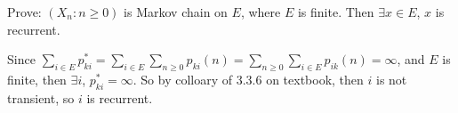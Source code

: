 \documentclass{ctexart}
\begin{document}
\begin{problem}\label{pro:3}
  Prove: \((X_n: n \geq 0)\) is Markov chain on \(E\), where \(E\) is finite. Then \(\exists x \in E\), \(x\) is recurrent.
\end{problem}
\begin{solution}
  Since \(\sum_{i \in E}p_{ki}^{*}=\sum_{i \in E}\sum_{n \geq 0}p_{ki}(n)=\sum_{n \geq 0}\sum_{i \in E}p_{ik}(n)=\infty\), and \(E\) is finite,
  then \(\exists i\), \(p_{ki}^{*}=\infty\). So by colloary of 3.3.6 on textbook, then \(i\) is not
  transient, so \(i\) is recurrent.
\end{solution}
\end{document}
